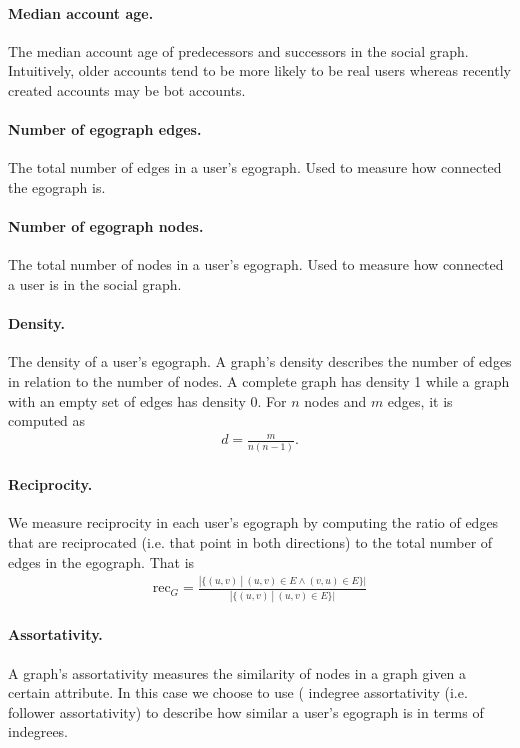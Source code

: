 \paragraph{Median account age.} The median account age of predecessors and successors in the social graph. Intuitively, older accounts tend to be more likely to be real users whereas recently created accounts may be bot accounts.

\paragraph{Number of egograph edges.} The total number of edges in a user's egograph. Used to measure how connected the egograph is.

\paragraph{Number of egograph nodes.} The total number of nodes in a user's egograph. Used to measure how connected a user is in the social graph.

\paragraph{Density.} The density of a user's egograph. A graph's density describes the number of edges in relation to the number of nodes. A complete graph has density 1 while a graph with an empty set of edges has density 0. For $n$ nodes and $m$ edges, it is computed as
\begin{align*}
    d = \frac{m}{n(n-1)}.
\end{align*}

\paragraph{Reciprocity.} We measure reciprocity in each user's egograph by computing the ratio of edges that are reciprocated (i.e. that point in both directions) to the total number of edges in the egograph. That is
\begin{align*}
   \mathrm{rec}_G = \frac{|\{(u,v) \ | \ (u,v) \in E \wedge (v,u) \in E \}|}{|\{ (u,v) \ | \ (u,v) \in E \}|}
\end{align*}

\paragraph{Assortativity.} A graph's assortativity measures the similarity of nodes in a graph given a certain attribute. In this case we choose to use ( indegree assortativity (i.e. follower assortativity) to describe how similar a user's egograph is in terms of indegrees.


